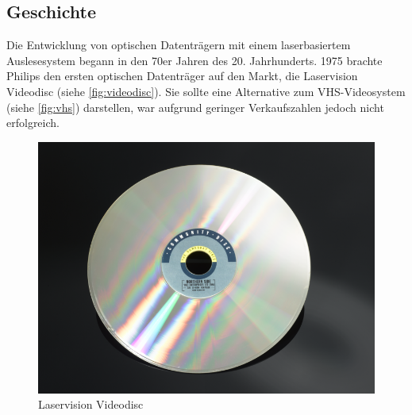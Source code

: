 \subsection{Geschichte}
\label{subsec:cdgeschichte}

Die Entwicklung von optischen Datenträgern mit einem laserbasiertem
Auslesesystem begann in den 70er Jahren des 20. Jahrhunderts. 1975 brachte
Philips den ersten optischen Datenträger auf den Markt, die Laservision
Videodisc (siehe \autoref{fig:videodisc}). Sie sollte eine Alternative zum
VHS-Videosystem (siehe \autoref{fig:vhs}) darstellen, war aufgrund geringer
Verkaufszahlen jedoch nicht erfolgreich.

\begin{figure}[h]
    \begin{center}
        \begin{minipage}[t]{0.3\textwidth}
            \begin{center}
                \includegraphics[height=0.1\textheight]{Bilder/Optische_Datentraeger_Die_Compact_Disc/Geschichte/videodisc.png}
                \caption[Laservision Videodisc \newline \url{http://www.sciencemuseum.org.uk/online_science/explore_our_collections/objects/index/smxg-8095649} (zuletzt aufgerufen am 19.09.2015)]{Laservision Videodisc}
                \label{fig:videodisc}
            \end{center}
        \end{minipage}
        \hspace{0.025\textwidth}
        \begin{minipage}[t]{0.3\textwidth}

\end{minipage}
\end{center}
\end{figure}
